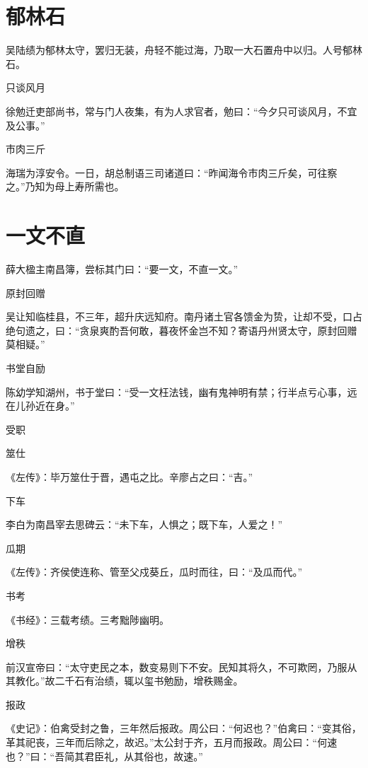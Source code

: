 \documentclass[a4paper,12pt,UTF8,twoside]{ctexbook}
\begin{document}
    \section{郁林石}
    
    吴陆绩为郁林太守，罢归无装，舟轻不能过海，乃取一大石置舟中以归。人号郁林石。
    
    只谈风月
    
    徐勉迁吏部尚书，常与门人夜集，有为人求官者，勉曰：“今夕只可谈风月，不宜及公事。”
    
    市肉三斤
    
    海瑞为淳安令。一日，胡总制语三司诸道曰：“昨闻海令市肉三斤矣，可往察之。”乃知为母上寿所需也。
    
    \section{一文不直}
    
    薛大楹主南昌簿，尝标其门曰：“要一文，不直一文。”
    
    原封回赠
    
    吴让知临桂县，不三年，超升庆远知府。南丹诸土官各馈金为贽，让却不受，口占绝句遗之，曰：“贪泉爽酌吾何敢，暮夜怀金岂不知？寄语丹州贤太守，原封回赠莫相疑。”
    
    书堂自励
    
    陈幼学知湖州，书于堂曰：“受一文枉法钱，幽有鬼神明有禁；行半点亏心事，远在儿孙近在身。”
    
    受职
    
    筮仕
    
    《左传》：毕万筮仕于晋，遇屯之比。辛廖占之曰：“吉。”
    
    下车
    
    李白为南昌宰去思碑云：“未下车，人惧之；既下车，人爱之！”
    
    瓜期
    
    《左传》：齐侯使连称、管至父戍葵丘，瓜时而往，曰：“及瓜而代。”
    
    书考
    
    《书经》：三载考绩。三考黜陟幽明。
    
    增秩
    
    前汉宣帝曰：“太守吏民之本，数变易则下不安。民知其将久，不可欺罔，乃服从其教化。”故二千石有治绩，辄以玺书勉励，增秩赐金。
    
    报政
    
    《史记》：伯禽受封之鲁，三年然后报政。周公曰：“何迟也？”伯禽曰：“变其俗，革其祀丧，三年而后除之，故迟。”太公封于齐，五月而报政。周公曰：“何速也？”曰：“吾简其君臣礼，从其俗也，故速。”
    
\end{document}
